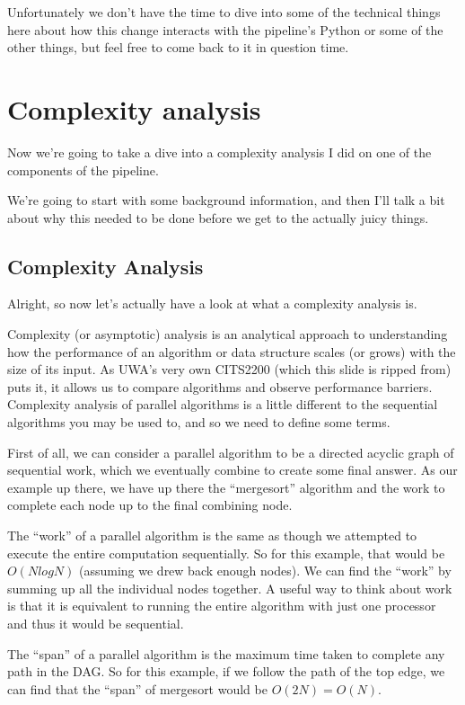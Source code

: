\documentclass{article}
\begin{document}
Unfortunately we don't have the time to dive into some of the technical things here about how this change interacts with the pipeline's Python or some of the other things, but feel free to come back to it in question time.

\section{Complexity analysis}

Now we're going to take a dive into a complexity analysis I did on one of the components of the pipeline.

We're going to start with some background information, and then I'll talk a bit about why this needed to be done before we get to the actually juicy things.

\subsection{Complexity Analysis}

Alright, so now let's actually have a look at what a complexity analysis is.

Complexity (or asymptotic) analysis is an analytical approach to understanding how the performance of an algorithm or data structure scales (or grows) with the size of its input.
As UWA's very own CITS2200 (which this slide is ripped from) puts it, it allows us to compare algorithms and observe performance barriers.
Complexity analysis of parallel algorithms is a little different to the sequential algorithms you may be used to, and so we need to define some terms.

First of all, we can consider a parallel algorithm to be a directed acyclic graph of sequential work, which we eventually combine to create some final answer.
As our example up there, we have up there the ``mergesort'' algorithm and the work to complete each node up to the final combining node.

The ``work'' of a parallel algorithm is the same as though we attempted to execute the entire computation sequentially.
So for this example, that would be $O(N log N)$ (assuming we drew back enough nodes).
We can find the ``work'' by summing up all the individual nodes together.
A useful way to think about work is that it is equivalent to running the entire algorithm with just one processor \textemdash{} and thus it would be sequential.

The ``span'' of a parallel algorithm is the maximum time taken to complete any path in the DAG.
So for this example, if we follow the path of the top edge, we can find that the ``span'' of mergesort would be $O(2N) = O(N)$.
\end{document}
